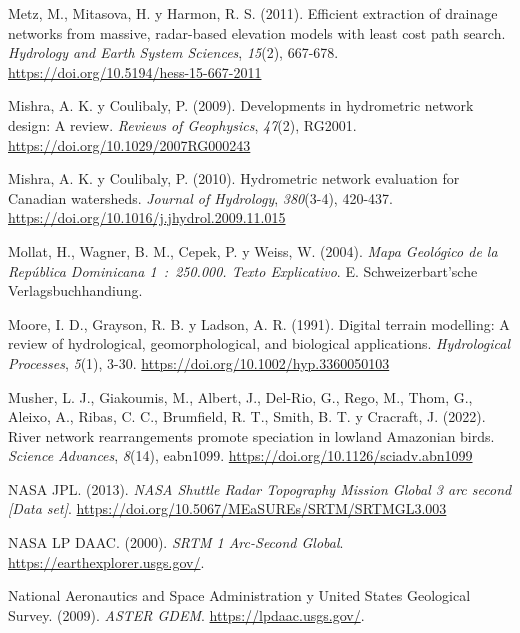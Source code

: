 \documentclass[spanish]{article}
\newlength{\cslhangindent}
\newlength{\cslentryspacingunit} %
\newenvironment{CSLReferences}[2] %
 {%
  \setlength{\parindent}{0pt}
  \ifodd #1
  \let\oldpar\par
  \def\par{\hangindent=\cslhangindent\oldpar}
  \fi
  \setlength{\parskip}{#2\cslentryspacingunit}
 }%
 {}
\begin{document}
\begin{CSLReferences}{1}{0}
\leavevmode{}%
Metz, M., Mitasova, H. y Harmon, R. S. (2011). Efficient extraction of
drainage networks from massive, radar-based elevation models with least
cost path search. \emph{Hydrology and Earth System Sciences},
\emph{15}(2), 667-678. \url{https://doi.org/10.5194/hess-15-667-2011}

\leavevmode{}%
Mishra, A. K. y Coulibaly, P. (2009). Developments in hydrometric
network design: A review. \emph{Reviews of Geophysics}, \emph{47}(2),
RG2001. \url{https://doi.org/10.1029/2007RG000243}

\leavevmode{}%
Mishra, A. K. y Coulibaly, P. (2010). Hydrometric network evaluation for
Canadian watersheds. \emph{Journal of Hydrology}, \emph{380}(3-4),
420-437. \url{https://doi.org/10.1016/j.jhydrol.2009.11.015}

\leavevmode{}%
Mollat, H., Wagner, B. M., Cepek, P. y Weiss, W. (2004). \emph{{Mapa
Geol{ó}gico de la Rep{ú}blica Dominicana 1~:~250.000. Texto
Explicativo}}. E. Schweizerbart'sche Verlagsbuchhandiung.

\leavevmode{}%
Moore, I. D., Grayson, R. B. y Ladson, A. R. (1991). Digital terrain
modelling: A review of hydrological, geomorphological, and biological
applications. \emph{Hydrological Processes}, \emph{5}(1), 3-30.
\url{https://doi.org/10.1002/hyp.3360050103}

\leavevmode{}%
Musher, L. J., Giakoumis, M., Albert, J., Del-Rio, G., Rego, M., Thom,
G., Aleixo, A., Ribas, C. C., Brumfield, R. T., Smith, B. T. y Cracraft,
J. (2022). River network rearrangements promote speciation in lowland
{Amazonian} birds. \emph{Science Advances}, \emph{8}(14), eabn1099.
\url{https://doi.org/10.1126/sciadv.abn1099}

\leavevmode{}%
NASA JPL. (2013). \emph{NASA Shuttle Radar Topography Mission Global 3
arc second {[}Data set{]}}.
\url{https://doi.org/10.5067/MEaSUREs/SRTM/SRTMGL3.003}

\leavevmode{}%
NASA LP DAAC. (2000). \emph{SRTM 1 Arc-Second Global}.
\url{https://earthexplorer.usgs.gov/}.

\leavevmode{}%
National Aeronautics and Space Administration y United States Geological
Survey. (2009). \emph{{ASTER GDEM}}. \url{https://lpdaac.usgs.gov/}.


\end{CSLReferences}
\end{document}
